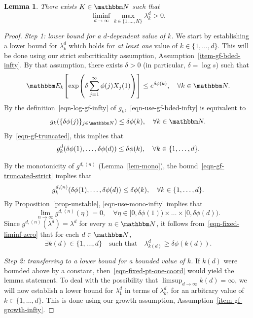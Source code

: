 \documentclass[11pt]{article}
\theoremstyle{plain}
\newtheorem{lem}[thm]{Lemma}
\theoremstyle{definition}
\numberwithin{equation}{section}
\newcommand{\eqb}{\begin{equation}}
\newcommand{\eqe}{\end{equation}}
\newcommand{\eqbn}{\begin{equation*}}
\newcommand{\eqen}{\end{equation*}}
\newcommand{\BB}{\mathbbm}
\let\originalleft\left
\let\originalright\right
\renewcommand{\left}{\mathopen{}\mathclose\bgroup\originalleft}
\renewcommand{\right}{\aftergroup\egroup\originalright}
\begin{document}
\begin{lem} \label{lem-fixed-liminf}
There exists $K\in\BB N$ such that 
\eqbn
\liminf_{d  \to \infty} \max_{k\in \{1,\dots,K\}} \lambda_k^d > 0 .
\eqen 
\end{lem} 
\begin{proof}
\noindent\textit{Step 1: lower bound for a $d$-dependent value of $k$.}
We start by establishing a lower bound for $\lambda_k^d$ which holds for \emph{at least one} value of $k \in \{1,\dots,d\}$. This will be done using our strict subcriticality assumption, Assumption~\ref{item-gf-bded-infty}. 
By that assumption, there exists $\delta > 0$ (in particular, $\delta  = \log s$) such that 
\eqb \label{eqn-use-gf-bded-infty}
\BB E_k\left[ \exp\left( \delta   \sum_{j=1}^\infty \phi(j) X_j(1) \right) \right]   
\leq  e^{\delta \phi(k) }   ,\quad\forall k \in \BB N . 
\eqe 
By the definition~\eqref{eqn-log-gf-infty} of $g_k$,~\eqref{eqn-use-gf-bded-infty} is equivalent to
\eqb
g_k\left( \{\delta \phi(j)\}_{j \in \BB N} \right) \leq \delta \phi(k) ,\quad \forall k \in \BB N . 
\eqe
By~\eqref{eqn-gf-truncated}, this implies that
\eqb \label{eqn-gf-truncated-strict} 
g_k^d \left( \delta \phi(1)  ,\dots, \delta \phi(d) \right) \leq  \delta \phi(k)  ,\quad\forall k\in \{1,\dots,d\} .
\eqe 

By the monotonicity of $g^{d,(n)}$ (Lemma~\ref{lem-mono}), the bound~\eqref{eqn-gf-truncated-strict} implies that
\eqb \label{eqn-use-mono-infty} 
  g_k^{d,(n)} \left( \delta \phi(1)  ,\dots, \delta \phi(d) \right) \leq \delta \phi(k) ,\quad\forall k \in \{1,\dots,d\} . 
\eqe  
By Proposition~\ref{prop-unstable}, \eqref{eqn-use-mono-infty} implies that
\eqb \label{eqn-fixed-liminf-zero}
\lim_{n\to\infty} g^{d,(n)}(\eta) = 0,\quad\forall \eta \in [0,\delta\phi(1)) \times \dots \times [0,\delta \phi(d)) .
\eqe 
Since $g^{d,(n)}(\lambda^d) = \lambda^d$ for every $n\in\BB N$, it follows from~\eqref{eqn-fixed-liminf-zero} that for each $d\in\BB N$, 
\eqb \label{eqn-fixed-pt-one-coord}
\exists k(d) \in \{1,\dots,d\}  \quad \text{such that} \quad \lambda_{k(d)}^d \geq \delta \phi(k(d)) .
\eqe

\noindent\textit{Step 2: transferring to a lower bound for a bounded value of $k$.}
If $k(d)$ were bounded above by a constant, then~\eqref{eqn-fixed-pt-one-coord} would yield the lemma statement.
To deal with the possibility that $\limsup_{d\to\infty} k(d)  = \infty$, we will now establish a lower bound for $\lambda_1^d$ in terms of $\lambda_k^d$, for an arbitrary value of $k\in \{1,\dots,d\}$. This is done using our growth assumption, Assumption~\ref{item-gf-growth-infty}. 


\end{proof}
\end{document}

